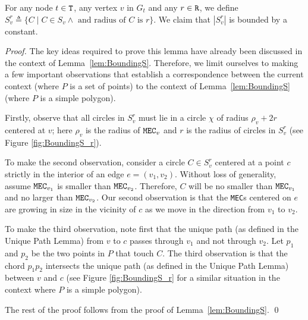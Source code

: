 \documentclass[12pt]{llncs}
\begin{document}
\begin{lemma} \label{lem:BoundingS2}
For any  node $t \in {\tt T}$, any vertex $v$ in $G_t$ and any $r \in {\tt R}$, we define  $S_v^r \triangleq \{C \mid C \in S_v \wedge \text{ and radius of $C$ is $r$}\} $. We claim that $|S_v^r|$ is
bounded by a constant. 
\end{lemma}
\begin{proof}
The key ideas required to prove this lemma have already been discussed in the 
context of 
Lemma~\ref{lem:BoundingS}. Therefore, we limit ourselves 
to making a few  important observations that establish a correspondence between the 
current context (where $P$ is a set of points) to the context of 
Lemma~\ref{lem:BoundingS} (where $P$ is a simple polygon). 

Firstly, observe that all circles in $S_v^r$ must lie in a circle $\chi$ of radius $\rho_v + 2r
$ 
centered at $v$; here $\rho_v$ is the radius of  ${\tt MEC}_{v}$ 
and $r$ is the radius of circles in $S_v^r$ (see Figure \ref{fig:BoundingS_r}).

To make the second observation, consider a circle $C \in S_v^r$ centered at a point 
$c$ 
strictly in the interior of  an edge $e = (v_1, v_2)$.
Without loss of generality,  assume ${\tt MEC}_{v_1}$ is smaller than ${\tt MEC}
_{v_2}$. 
Therefore, $C$ will be no smaller  than ${\tt MEC}_{v_1}$ and 
no larger  than ${\tt MEC}_{v_2}$. Our second observation is that the {\tt MEC}s  
centered on 
$e$ are growing in size in the vicinity of $c$ as we move in 
the direction from $v_1$ to $v_2$. 

To make the third observation, note first that the unique path (as defined in the 
Unique 
Path Lemma) from $v$ to $c$ passes through $v_1$ and not 
through $v_2$. Let $p_1$ and 
$p_2$ be the two points in $P$ that touch $C$. The third observation is that  the 
chord 
$p_1p_2$ intersects the unique path (as defined in the Unique Path Lemma) between 
$v$ 
and $c$ (see Figure
\ref{fig:BoundingS_r} for a similar situation in the context where $P$ is a simple 
polygon).  

The rest of the proof follows from the proof of Lemma~\ref{lem:BoundingS}. \qed
\end{proof}
\end{document}
